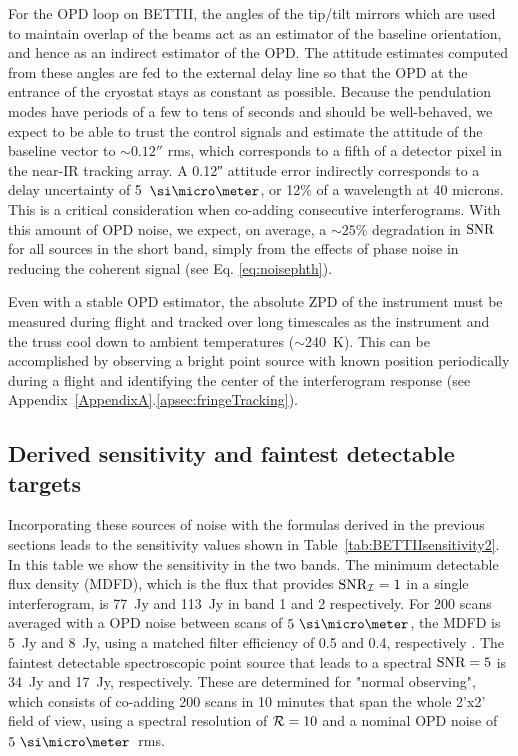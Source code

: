 For the OPD loop on BETTII, the angles of the tip/tilt mirrors which are used to maintain overlap of the beams act as an estimator of the baseline orientation, and hence as an indirect estimator of the OPD. The attitude estimates computed from these angles are fed to the external delay line so that the OPD at the entrance of the cryostat stays as constant as possible. Because the pendulation modes have periods of a few to tens
of seconds and should be well-behaved, we expect to be able to trust the control signals and estimate the attitude of the baseline vector to $\sim \ang{;;0.12}$ rms, which corresponds to a fifth of a detector pixel in the near-IR tracking array. A \ang{;;0.12} attitude error indirectly corresponds to a delay uncertainty of 5~$\um$, or 12\% of a wavelength at 40 microns. This is a critical consideration when co-adding consecutive interferograms. With this amount of OPD noise, we expect, on average, a $\sim 25\%$ degradation in $\textrm{SNR}$ for all sources in the short band, simply from the effects of phase noise in reducing the coherent signal (see Eq. \ref{eq:noisephth}).

Even with a stable OPD estimator, the absolute ZPD of the instrument must be measured during flight and tracked over long timescales as the instrument and the truss cool down to ambient temperatures ($\sim$240~K). This can be accomplished by observing a bright point source with known position periodically during a flight and identifying the center of the interferogram response (see Appendix~\ref{AppendixA}.\ref{apsec:fringeTracking}).

\subsection{Derived sensitivity and faintest detectable targets}

Incorporating these sources of noise with the formulas derived in the previous sections leads to the sensitivity values shown in Table~\ref{tab:BETTIIsensitivity2}. In this table we show the sensitivity in the two bands. The minimum detectable flux density (MDFD), which is the flux that provides $\textrm{SNR}_{\mathcal{I}} = 1$ in a single interferogram, is 77~Jy and 113~Jy in band 1 and 2 respectively. For 200 scans averaged with a OPD noise between scans of $5~\um$, the MDFD is 5~Jy and 8~Jy, using a matched filter efficiency of 0.5 and 0.4, respectively \citep{Mighell:2005fwa}. The faintest detectable spectroscopic point source that leads to a spectral $\textrm{SNR}=5$ is 34~Jy and 17~Jy, respectively. These are determined for "normal observing", which consists of co-adding 200 scans in 10 minutes that span the whole 2'x2' field of view, using a spectral resolution of $\mathcal{R}=10$ and a nominal OPD noise of $5~\um$~rms. 

